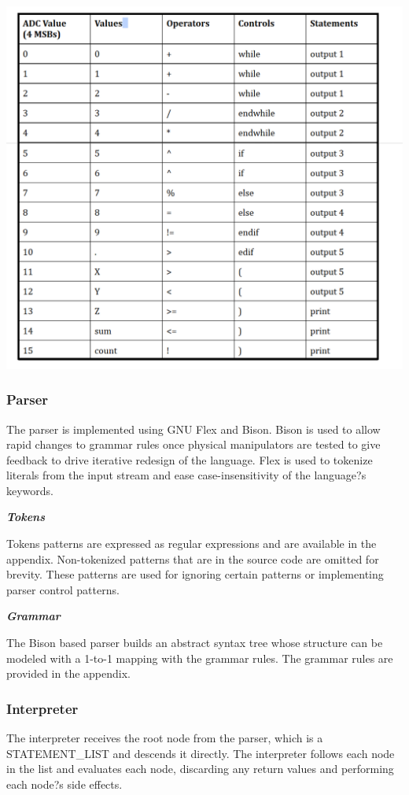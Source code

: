 \documentclass[12pt,a4paper]{article}
\begin{document}
    
     \includegraphics[width=6.5in]{lxer.png}
     \newpage
   \subsubsection{Parser}
   The parser is implemented using GNU Flex and Bison. Bison is used to allow rapid changes to grammar rules once physical manipulators are tested to give feedback to drive iterative redesign of the language. Flex is used to tokenize literals from the input stream and ease case-insensitivity of the language?s keywords.
   
 
   \textit{\textbf{Tokens}}
   
   Tokens patterns are expressed as regular expressions and are available in the appendix. Non-tokenized patterns that are in the source code are omitted for brevity. These patterns are used for ignoring certain patterns or implementing parser control patterns.
     
      \textit{\textbf{Grammar}}
      
      The Bison based parser builds an abstract syntax tree whose structure can be modeled with a 1-to-1 mapping with the grammar rules. The grammar rules are provided in the appendix.
      \subsubsection{Interpreter}
      The interpreter receives the root node from the parser, which is a STATEMENT\_LIST and descends it directly. The interpreter follows each node in the list and evaluates each node, discarding any return values and performing each node?s side effects.
      
\end{document}
